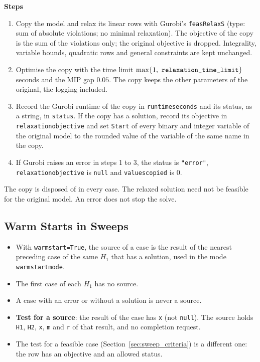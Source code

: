 \documentclass[11pt,a4paper]{article}
\theoremstyle{plain}
\theoremstyle{definition}
\newcommand{\blockhead}[1]{\par\noindent\textbf{#1}\par\nobreak}
\renewcommand{\_}{\textunderscore\allowbreak{}}
\begin{document}
\blockhead{Steps}
\begin{enumerate}[nosep,label=\arabic*.]
  \item Copy the model and relax its linear rows with Gurobi's \texttt{feasRelaxS} (type: sum of absolute violations; no minimal relaxation). The objective of the copy is the sum of the violations only; the original objective is dropped. Integrality, variable bounds, quadratic rows and general constraints are kept unchanged.
  \item Optimise the copy with the time limit $\max\{1,\ \texttt{relaxation\_time\_limit}\}$ seconds and the MIP gap $0.05$. The copy keeps the other parameters of the original, the logging included.
  \item Record the Gurobi runtime of the copy in \texttt{runtime\_seconds} and its status, as a string, in \texttt{status}. If the copy has a solution, record its objective in \texttt{relaxation\_objective} and set \texttt{Start} of every binary and integer variable of the original model to the rounded value of the variable of the same name in the copy.
  \item If Gurobi raises an error in steps 1 to 3, the status is \texttt{"error"}, \texttt{relaxation\_objective} is \texttt{null} and \texttt{values\_copied} is $0$.
\end{enumerate}
The copy is disposed of in every case. The relaxed solution need not be feasible for the original model. An error does not stop the solve.

\subsection{Warm Starts in Sweeps}
\label{sec:warm_sweeps}

\begin{itemize}[nosep,leftmargin=1.5em]
  \item With \texttt{warm\_start=True}, the source of a case is the result of the nearest preceding case of the same $H_1$ that has a solution, used in the mode \texttt{warm\_start\_mode}.
  \item The first case of each $H_1$ has no source.
  \item A case with an error or without a solution is never a source.
  \item \textbf{Test for a source}: the result of the case has \texttt{x} (not \texttt{null}). The source holds \texttt{H1}, \texttt{H2}, \texttt{x}, \texttt{m} and \texttt{r} of that result, and no completion request.
  \item The test for a feasible case (Section~\ref{sec:sweep_criteria}) is a different one: the row has an objective and an allowed status.
\end{itemize}
\end{document}
